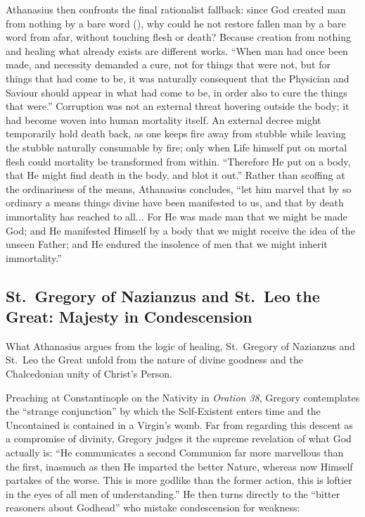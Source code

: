 Athanasius then confronts the final rationalist fallback: since God created man from nothing by a bare word (), why could he not restore fallen man by a bare word from afar, without touching flesh or death? Because creation from nothing and healing what already exists are different works. ``When man had once been made, and necessity demanded a cure, not for things that were not, but for things that had come to be, it was naturally consequent that the Physician and Saviour should appear in what had come to be, in order also to cure the things that were.'' Corruption was not an external threat hovering outside the body; it had become woven into human mortality itself. An external decree might temporarily hold death back, as one keeps fire away from stubble while leaving the stubble naturally consumable by fire; only when Life himself put on mortal flesh could mortality be transformed from within. ``Therefore He put on a body, that He might find death in the body, and blot it out.'' Rather than scoffing at the ordinariness of the means, Athanasius concludes, ``let him marvel that by so ordinary a means things divine have been manifested to us, and that by death immortality has reached to all... For He was made man that we might be made God; and He manifested Himself by a body that we might receive the idea of the unseen Father; and He endured the insolence of men that we might inherit immortality.''

\subsection{St.\ Gregory of Nazianzus and St.\ Leo the Great: Majesty in Condescension}

What Athanasius argues from the logic of healing, St.\ Gregory of Nazianzus and St.\ Leo the Great unfold from the nature of divine goodness and the Chalcedonian unity of Christ's Person.

Preaching at Constantinople on the Nativity in \textit{Oration 38}, Gregory contemplates the ``strange conjunction'' by which the Self-Existent enters time and the Uncontained is contained in a Virgin's womb. Far from regarding this descent as a compromise of divinity, Gregory judges it the supreme revelation of what God actually is: ``He communicates a second Communion far more marvellous than the first, inasmuch as then He imparted the better Nature, whereas now Himself partakes of the worse. This is more godlike than the former action, this is loftier in the eyes of all men of understanding.'' He then turns directly to the ``bitter reasoners about Godhead'' who mistake condescension for weakness:

